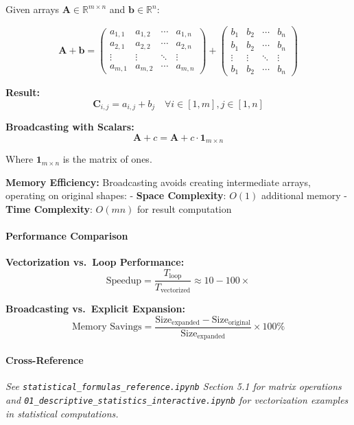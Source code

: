 \documentclass[11pt]{article}
\begin{document}
Given arrays \(\mathbf{A} \in \mathbb{R}^{m \times n}\) and
\(\mathbf{b} \in \mathbb{R}^n\):

\[\mathbf{A} + \mathbf{b} = \begin{pmatrix}
a_{1,1} & a_{1,2} & \cdots & a_{1,n} \\
a_{2,1} & a_{2,2} & \cdots & a_{2,n} \\
\vdots & \vdots & \ddots & \vdots \\
a_{m,1} & a_{m,2} & \cdots & a_{m,n}
\end{pmatrix} + \begin{pmatrix} b_1 & b_2 & \cdots & b_n \\ b_1 & b_2 & \cdots & b_n \\ \vdots & \vdots & \ddots & \vdots \\ b_1 & b_2 & \cdots & b_n \end{pmatrix}\]

\textbf{Result:}
\[\mathbf{C}_{i,j} = a_{i,j} + b_j \quad \forall i \in [1,m], j \in [1,n]\]

\textbf{Broadcasting with Scalars:}
\[\mathbf{A} + c = \mathbf{A} + c \cdot \mathbf{1}_{m \times n}\]

Where \(\mathbf{1}_{m \times n}\) is the matrix of ones.

\textbf{Memory Efficiency:} Broadcasting avoids creating intermediate
arrays, operating on original shapes: - \textbf{Space Complexity}:
\(O(1)\) additional memory - \textbf{Time Complexity}: \(O(mn)\) for
result computation

\paragraph{Performance Comparison}\label{performance-comparison}

\textbf{Vectorization vs.~Loop Performance:}
\[\text{Speedup} = \frac{T_{\text{loop}}}{T_{\text{vectorized}}} \approx 10-100\times\]

\textbf{Broadcasting vs.~Explicit Expansion:}
\[\text{Memory Savings} = \frac{\text{Size}_{\text{expanded}} - \text{Size}_{\text{original}}}{\text{Size}_{\text{expanded}}} \times 100\%\]

\paragraph{Cross-Reference}\label{cross-reference}

\emph{See \texttt{statistical\_formulas\_reference.ipynb} Section 5.1
for matrix operations and
\texttt{01\_descriptive\_statistics\_interactive.ipynb} for
vectorization examples in statistical computations.}
\end{document}
